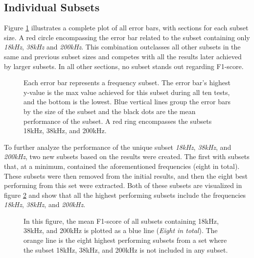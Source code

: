     \subsection{Individual Subsets}
        Figure \ref{errorbar_fig} illustrates a complete plot of all error bars, with sections for each subset size. A red circle encompassing the error bar related to the subset containing only \textit{18kHz}, \textit{38kHz} and \textit{200kHz}. This combination outclasses all other subsets in the same and previous subset sizes and competes with all the results later achieved by larger subsets. In all other sections, no subset stands out regarding F1-score.
        \clearpage
        \begin{figure}[H]
            \centering
                        
            \caption[Error bars per combination]{Each error bar represents a frequency subset. The error bar's highest y-value is the max value achieved for this subset during all ten tests, and the bottom is the lowest. Blue vertical lines group the error bars by the size of the subset and the black dots are the mean performance of the subset. A red ring encompasses the subsets 18kHz, 38kHz, and 200kHz.}
          	\medskip 
            \label{errorbar_fig}
        \end{figure}
    
        To further analyze the performance of the unique subset \textit{18kHz}, \textit{38kHz}, and \textit{200kHz}, two new subsets based on the results were created. The first with subsets that, at a minimum, contained the aforementioned frequencies (eight in total). These subsets were then removed from the initial results, and then the eight best performing from this set were extracted. Both of these subsets are visualized in figure \ref{with_without_figure} and show that all the highest performing subsets include the frequencies \textit{18kHz}, \textit{38kHz}, and \textit{200kHz}.
        
        \begin{figure}[H] 
            \centering
            
            \caption[With and without unique subset]{In this figure, the mean F1-score of all subsets containing 18kHz, 38kHz, and 200kHz is plotted as a blue line (\textit{Eight in total}). The orange line is the eight highest performing subsets from a set where the subset 18kHz, 38kHz, and 200kHz is not included in any subset.}
          	\medskip 
            \label{with_without_figure}
        \end{figure}
        

